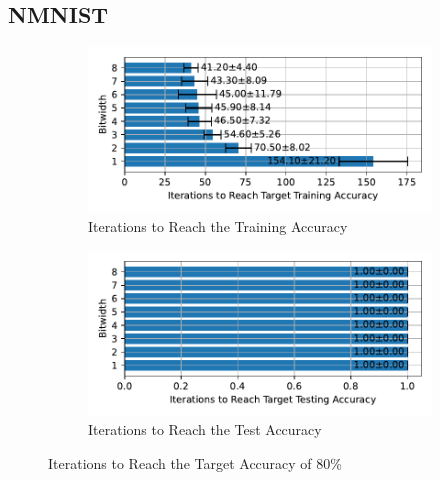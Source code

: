     \subsection{NMNIST}
    \label{appendix:iterations_nmnist}
        \begin{figure}[H]
            \centering
            \begin{subfigure}[H]{0.6\textwidth}
                \centering
                \includegraphics[width=\textwidth]{../standard/NMNIST/plots/nmnist_train_iters_horizontal.pdf}
                \caption{Iterations to Reach the Training Accuracy}
            \end{subfigure}
            \hfill
            \begin{subfigure}[H]{0.6\textwidth}
                \centering
                \includegraphics[width=\textwidth]{../standard/NMNIST/plots/nmnist_test_iters_horizontal.pdf}
                \caption{Iterations to Reach the Test Accuracy}
            \end{subfigure}
            \caption{Iterations to Reach the Target Accuracy of 80\%}
        \end{figure}

